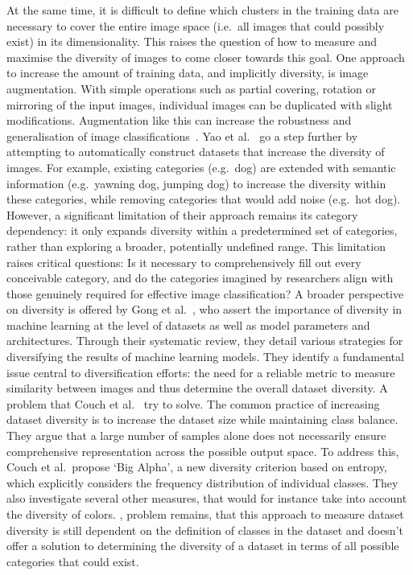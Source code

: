 At the same time, it is difficult to define which clusters in the training data are necessary to cover the entire image space (i.e.\ all images that could possibly exist) in its dimensionality. This raises the question of how to measure and maximise the diversity of images to come closer towards this goal. One approach to increase the amount of training data, and implicitly diversity, is image augmentation. With simple operations such as partial covering, rotation or mirroring of the input images, individual images can be duplicated with slight modifications. Augmentation like this can increase the robustness and generalisation of image classifications~\cite{shortenSurveyImageData2019}. Yao et al.~\cite{yaoAutomaticConstructionDiverse2017} go a step further by attempting to automatically construct datasets that increase the diversity of images. For example, existing categories (e.g.\ dog) are extended with semantic information (e.g.\ yawning dog, jumping dog) to increase the diversity within these categories, while removing categories that would add noise (e.g.\ hot dog). However, a significant limitation of their approach remains its category dependency: it only expands diversity within a predetermined set of categories, rather than exploring a broader, potentially undefined range. This limitation raises critical questions: Is it necessary to comprehensively fill out every conceivable category, and do the categories imagined by researchers align with those genuinely required for effective image classification? A broader perspective on diversity is offered by Gong et al.~\cite{gongDiversityMachineLearning2019}, who assert the importance of diversity in machine learning at the level of datasets as well as model parameters and architectures. Through their systematic review, they detail various strategies for diversifying the results of machine learning models. They identify a fundamental issue central to diversification efforts: the need for a reliable metric to measure similarity between images and thus determine the overall dataset diversity. A problem that Couch et al.~\cite{couchSizeClassBalance2024} try to solve. The common practice of increasing dataset diversity is to increase the dataset size while maintaining class balance. They argue that a large number of samples alone does not necessarily ensure comprehensive representation across the possible output space. To address this, Couch et al.\ propose `Big Alpha', a new diversity criterion based on entropy, which explicitly considers the frequency distribution of individual classes. They also investigate several other measures, that would for instance take into account the diversity of colors. , problem remains, that this approach to measure dataset diversity is still dependent on the definition of classes in the dataset and doesn't offer a solution to determining the diversity of a dataset in terms of all possible categories that could exist. 

